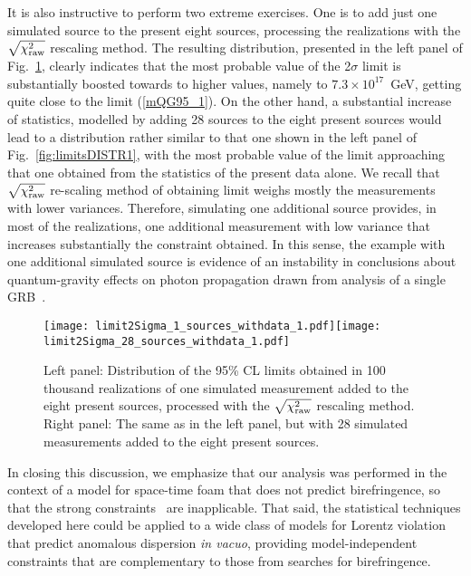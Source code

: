 \documentclass[12pt]{article}
\begin{document}
{It is also instructive to perform two extreme exercises.
One is to add just one simulated source to the present eight sources, processing the realizations with the
$\sqrt{\chi_{\rm raw}^2}$ rescaling method. The resulting distribution, presented in the left panel of Fig.~\ref{fig:limitsDISTR4},
clearly indicates that the most probable value of  the 2$\sigma$ limit is substantially boosted towards to higher values, namely to
$7.3\times 10^{17}$~GeV, getting quite close to the limit (\ref{mQG95_1}). On the other hand, a substantial increase of statistics,
modelled by adding  28 sources to the eight present sources would lead to a distribution rather
similar to that one shown in the left panel of Fig.~\ref{fig:limitsDISTR1}, with
the most probable value of the limit approaching that one obtained from the statistics of the present data alone.
We recall that  $\sqrt{\chi_{\rm raw}^2}$ re-scaling method of obtaining
limit weighs mostly the measurements with lower variances. Therefore,
simulating one additional source provides, in most of the realizations, one additional measurement with low
variance that increases substantially the constraint obtained. In this sense,
the example with one additional simulated source is evidence of an instability in conclusions about
quantum-gravity effects on photon propagation drawn from analysis of a
single GRB~\cite{Fermi_080916,Fermi_090510,NonFermi_090510,Nemiroff}.

\begin{figure}
\centering
\texttt{[image: limit2Sigma\_1\_sources\_withdata\_1.pdf]}\hspace{0cm}\texttt{[image: limit2Sigma\_28\_sources\_withdata\_1.pdf]}
\vspace{-0.4cm}
\caption{Left panel: Distribution of the 95\% CL limits obtained in 100 thousand realizations of one simulated measurement
added to the eight present sources, processed with the $\sqrt{\chi_{\rm raw}^2}$ rescaling method.
Right panel: The same as in the left panel, but with 28 simulated measurements added to the eight present sources.}
\label{fig:limitsDISTR4}
\end{figure}

In closing this discussion, we emphasize that our analysis was performed in the context of a model
for space-time foam that does not predict birefringence, so that the
strong constraints~\cite{Stec_Polar,INTEGRAL_Polar,strict_Polar,Lin_Pol,Kislat_Polar}
are inapplicable. That said, the statistical techniques developed here could be applied
to a wide class of models for Lorentz violation that predict
anomalous dispersion {\it in vacuo}, providing model-independent constraints that are
complementary to those from searches for birefringence.

}
\end{document}
